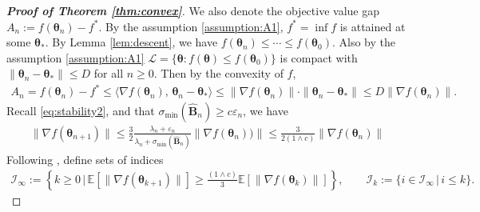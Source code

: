 \documentclass[11pt]{amsart}
\theoremstyle{plain}
\theoremstyle{definition}
\theoremstyle{remark}
\def\E{\mathbb{E}}
\def\bE{\mathbf{E}}
\def\eps{\varepsilon}
\def\B{\mathbf{B}}
\def\param{\boldsymbol{\theta}}
\newcommand{\commHL}[1]{{\textcolor{blue}{#1}}}
\begin{document}
\begin{proof}[\textbf{Proof of Theorem \ref{thm:convex}}]
	
	We also denote the objective value gap $A_{n}:= f(\param_{n}) - f^{*}$. By the assumption \ref{assumption:A1}, $f^{*} = \inf f$ is attained at some $\param_{*}$. 
	By Lemma \ref{lem:descent}, we have $f(\param_{n})\le \cdots \le f(\param_{0})$.  Also by the assumption \ref{assumption:A1} $\mathcal{L}=\{\param:f(\param)\leq f(\param_0)\}$ is compact    
    with $\| \param_{n} - \param_{*}\|\le D$  for all $n\ge 0$. Then by the convexity of $f$, \begin{align}\label{eq:objective_gap_upper_bd_convex}
		A_n=f(\param_{n}) - f^{*} \le \langle \nabla f(\param_{n}),\, \param_{n}-\param_{*} \rangle \le \| \nabla f(\param_{n}) \| \cdot \| \param_{n}-\param_{*} \| \le D \| \nabla f(\param_{n}) \| . 
	\end{align}
    Recall \eqref{eq:stability2}, and that $\sigma_{\min}(\hat{\B}_n)\geq c\eps_n$, we have
    \begin{align}\label{eq:stability2_simplified}
    \|\nabla f(\param_{n+1})\|\leq \frac{3}{2}\frac{\lambda_n+\eps_n}{\lambda_n+\sigma_{\min}(\hat{\B}_n)}\|\nabla f(\param_n))\|\le \frac{3}{2(1\wedge c)}\|\nabla f(\param_n)\|
    \end{align}
	Following \cite{mishchenko2023regularized}, define sets of indices 
	\begin{align*}
		\mathcal{I}_{\infty}:= \left\{k\ge 0\,|\,  \E[\| \nabla f(\param_{k+1})\|]  \ge \frac{(1\wedge c)}{3}\E[\| \nabla f(\param_{k})\|] \right\}, \qquad 	\mathcal{I}_{k}:= \{i\in \mathcal{I}_{\infty}\,|\, i\le k \}. 
	\end{align*} 


\end{proof}
\end{document}
